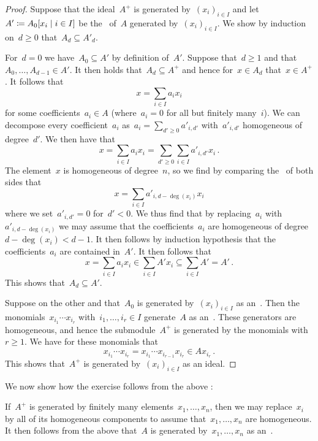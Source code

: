 \begin{proof}
  Suppose that the ideal~$A^+$ is generated by~$(x_i)_{i \in I}$ and let~$A' \defined A_0[x_i \suchthat i \in I]$ be the~ of~$A$ generated by~$(x_i)_{i \in I}$.
  We show by induction on~$d \geq 0$ that~$A_d \subseteq A'_d$.
  
  For~$d = 0$ we have~$A_0 \subseteq A'$ by definition of~$A'$.
  Suppose that~$d \geq 1$ and that~$A_0, \dotsc, A_{d-1} \in A'$.
  It then holds that~$A_d \subseteq A^+$ and hence for~$x \in A_d$ that~$x \in A^+$.
  It follows that
  \[
      x
    = \sum_{i \in I} a_i x_i
  \]
  for some coefficients~$a_i \in A$ (where~$a_i = 0$ for all but finitely many~$i$).
  We can decompose every coefficient~$a_i$ as~$a_i = \sum_{d' \geq 0} a'_{i,d'}$ with~$a'_{i,d'}$ homogeneous of degree~$d'$.
  We then have that
  \[
      x
    = \sum_{i \in I} a_i x_i
    = \sum_{d' \geq 0} \sum_{i \in I} a'_{i,d'} x_i \,.
  \]
  The element~$x$ is homogeneous of degree~$n$, so we find by comparing the~ of both sides that
  \[
      x
    = \sum_{i \in I} a'_{i, d-\deg(x_i)} x_i
  \]
  where we set~$a'_{i,d'} = 0$ for~$d' < 0$.
  We thus find that by replacing~$a_i$ with~$a'_{i,d-\deg(x_i)}$ we may assume that the coefficients~$a_i$ are homogeneous of degree~$d - \deg(x_i) < d - 1$.
  It then follows by induction hypothesis that the coefficients~$a_i$ are contained in~$A'$.
  It then follows that
  \[
              x
    =         \sum_{i \in I} a_i x_i
    \in       \sum_{i \in I} A' x_i
    \subseteq \sum_{i \in I} A'
    =         A' \,.
  \]
  This shows that~$A_d \subseteq A'$.
  
  Suppose on the other and that~$A_0$ is generated by~$(x_i)_{i \in I}$ as an~.
  Then the monomials~$x_{i_1} \dotsm x_{i_r}$ with~$i_1, \dotsc, i_r \in I$ generate~$A$ as an~{}.
  These generators are homogeneous, and hence the submodule~$A^+$ is generated by the monomials with~$r \geq 1$.
  We have for these monomials that
  \[
        x_{i_1} \dotsm x_{i_r}
    =   x_{i_1} \dotsm x_{i_{r-1}} x_{i_r}
    \in A x_{i_r} \,.
  \]
  This shows that~$A^+$ is generated by~$(x_i)_{i \in I}$ as an ideal.
\end{proof}

We now show how the exercise follows from the above :

If~$A^+$ is generated by finitely many elements~$x_1, \dotsc, x_n$, then we may replace~$x_i$ by all of its homogeneous components to assume that~$x_1, \dotsc, x_n$ are homogeneous.
It then follows from the above  that~$A$ is generated by~$x_1, \dotsc, x_n$ as an~.

